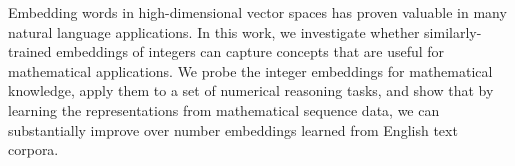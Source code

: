 Embedding words in high-dimensional vector spaces has proven valuable in many natural language applications. In this work, we investigate whether similarly-trained embeddings of integers can capture concepts that are useful for mathematical applications. We probe the integer embeddings for mathematical knowledge, apply them to a set of numerical reasoning tasks, and show that by learning the representations from mathematical sequence data, we can substantially improve over number embeddings learned from English text corpora.
